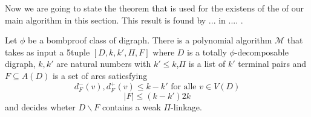 Now we are going to state the theorem that is used for the existens of the of our main algorithm in this section. 
This result is found by ... in .... .
\begin{thm}
    Let $\phi$ be a bombproof class of digraph. There is a polynomial algorithm $\mathcal{M}$ that takes as input a 5tuple $[D,k,k',\Pi,F]$ where $D$ is a totally $\phi$-decomposable digraph, $k,k'$ are natural numbers with $k'\leq k$,$\Pi$ is a list of $k'$ terminal pairs and $F\subseteq A(D)$ is a set of arcs satiesfying 
    \begin{equation}
        d_F^-(v),d_F^+(v)\leq k-k' \text{ for alle } v\in V(D)
    \end{equation}
    \begin{equation*}
        |F|\leq (k-k')2k
    \end{equation*}
    and decides wheter $D\backslash F$ contains a weak $\Pi$-linkage.
    \label{thm:mainalgo}
\end{thm}
   
